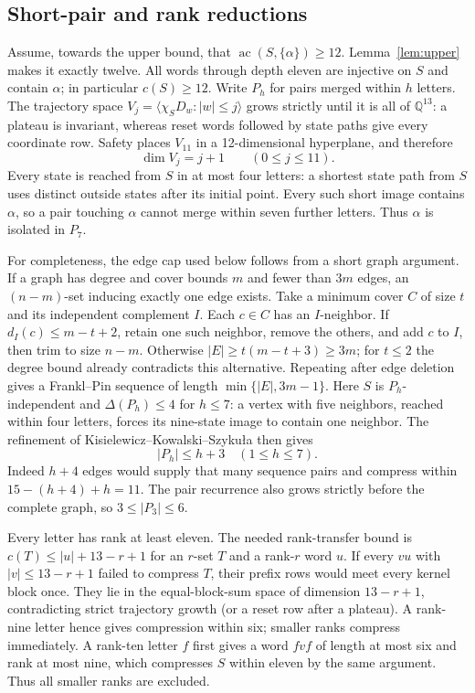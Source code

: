 \documentclass[10pt]{article}
\newcommand{\ac}{\operatorname{ac}}
\begin{document}
\subsection{Short-pair and rank reductions}
Assume, towards the upper bound, that $\ac(S,\{\alpha\})\ge12$.
Lemma~\ref{lem:upper} makes it exactly twelve. All words through depth eleven
are injective on $S$ and contain $\alpha$; in particular $c(S)\ge12$.
Write $P_h$ for pairs merged within $h$ letters. The trajectory space
$V_j=\langle\chi_SD_w:|w|\le j\rangle$ grows strictly until it is all of
$\mathbb Q^{13}$: a plateau is invariant, whereas reset words followed by
state paths give every coordinate row. Safety places $V_{11}$ in a
12-dimensional hyperplane, and therefore
\begin{equation}\label{eq:eleven-ranks}
 \dim V_j=j+1\qquad(0\le j\le11).
\end{equation}
Every state is reached from $S$ in at most four letters: a shortest state
path from $S$ uses distinct outside states after its initial point.
Every such short image contains $\alpha$, so a pair touching $\alpha$
cannot merge within seven further letters. Thus $\alpha$ is isolated in $P_7$.

For completeness, the edge cap used below follows from a short graph
argument. If a graph has degree and cover bounds $m$ and fewer than $3m$
edges, an $(n-m)$-set inducing exactly one edge exists. Take a minimum cover
$C$ of size $t$ and its independent complement $I$. Each $c\in C$ has an
$I$-neighbor. If $d_I(c)\le m-t+2$, retain one such neighbor, remove the
others, and add $c$ to $I$, then trim to size $n-m$. Otherwise
$|E|\ge t(m-t+3)\ge3m$; for $t\le2$ the degree bound already contradicts
this alternative. Repeating after edge deletion gives a Frankl--Pin
sequence of length $\min\{|E|,3m-1\}$. Here $S$ is $P_h$-independent and
$\Delta(P_h)\le4$ for $h\le7$: a vertex with five neighbors, reached within
four letters, forces its nine-state image to contain one neighbor.
The refinement of Kisielewicz--Kowalski--Szyku\l a then gives
\begin{equation}\label{eq:eleven-cap}
 |P_h|\le h+3\quad(1\le h\le7).
\end{equation}
Indeed $h+4$ edges would supply that many sequence pairs and compress
within $15-(h+4)+h=11$. The pair recurrence also grows strictly before the
complete graph, so $3\le|P_3|\le6$.

Every letter has rank at least eleven. The needed rank-transfer bound is
$c(T)\le|u|+13-r+1$ for an $r$-set $T$ and a rank-$r$ word $u$.
If every $vu$ with $|v|\le13-r+1$ failed to compress $T$, their prefix rows
would meet every kernel block once. They lie in the equal-block-sum space
of dimension $13-r+1$, contradicting strict trajectory growth (or a reset
row after a plateau). A rank-nine letter hence gives compression within
six; smaller ranks compress immediately. A rank-ten letter $f$ first
gives a word $fvf$ of length at most six and rank at most nine, which
compresses $S$ within eleven by the same argument. Thus all smaller ranks
are excluded.
\end{document}
